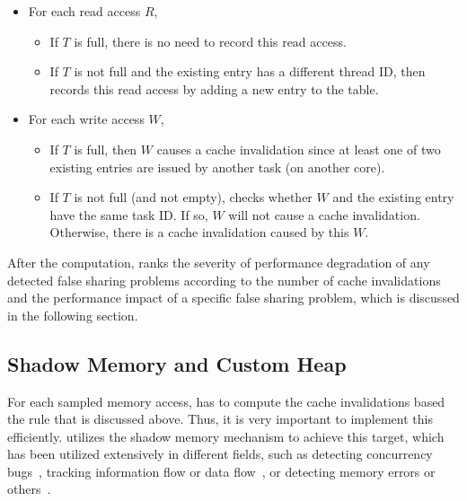 \begin{itemize}
\item
  For each read access $R$,
  \begin{itemize}
    \item
      If $T$ is full, there is no need to record this read access.
    \item
      If $T$ is not full and the existing entry has a different thread ID, 
      then \cheetah{} records this read access by adding a new entry to the table.
  \end{itemize}
\item
  For each write access $W$,  
  \begin{itemize}
    \item
      If $T$ is full, then $W$ causes a cache invalidation since at least one of two existing entries are issued by another task (on another core).
    \item
      If $T$ is not full (and not empty),
      \cheetah{} checks whether $W$ and the existing entry have the same task ID. If
      so, $W$ will not cause a cache invalidation. Otherwise, there is a cache invalidation caused by this $W$.
  \end{itemize}
\end{itemize}

      
After the computation, 
\cheetah{} ranks the severity of performance degradation of any detected false sharing problems according to the number of cache invalidations and the performance impact of a specific false sharing problem, which is discussed in the following section.  


\subsection{Shadow Memory and Custom Heap}

For each sampled memory access, \cheetah{} has to compute the cache invalidations based the rule that is discussed above. Thus, it is very important to implement this efficiently. \Cheetah{} utilizes the shadow memory mechanism to achieve this target, which has been utilized extensively in different fields, such as detecting concurrency bugs~\cite{Harrow:2000:RCM:645880.672080, helgrind, 404681, Savage:1997:EDD:268998.266641}, tracking information flow or data flow~\cite{Cheng:2006:TEF:1157733.1157903, Newsome05dynamictaint, Qin:2006:LLP:1194816.1194834}, or detecting memory errors or others~\cite{qinzhao, Hastings91purify:fast, Seward:2005:UVD:1247360.1247362, Narayanasamy:2006:ALO:1140277.1140303}. 

